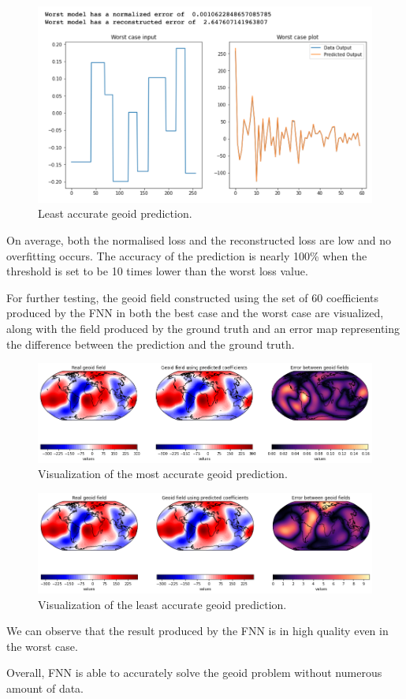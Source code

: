 \begin{figure}[H]
    \caption{Least accurate geoid prediction.}
    \includegraphics[scale=0.6]{figures/geoid_images/Geoid_Worst.png}
\end{figure}

On average, both the normalised loss and the reconstructed loss are low and no overfitting occurs. The accuracy of the prediction is nearly 100\% when the threshold is set to be 10 times lower than the worst loss value. 

For further testing, the geoid field constructed using the set of 60 coefficients produced by the FNN in both the best case and the worst case are visualized, along with the field produced by the ground truth and an error map representing the difference between the prediction and the ground truth.

\begin{figure}[H]
    \caption{Visualization of the most accurate geoid prediction.}
    \includegraphics[scale=0.4]{figures/geoid_images/Geoid_Best_visualization.png}
\end{figure}

\begin{figure}[H]
    \caption{Visualization of the least accurate geoid prediction.}
    \includegraphics[scale=0.4]{figures/geoid_images/Geoid_Worst_visualization.png}
\end{figure}

We can observe that the result produced by the FNN is in high quality even in the worst case.

Overall, FNN is able to accurately solve the geoid problem without numerous amount of data.